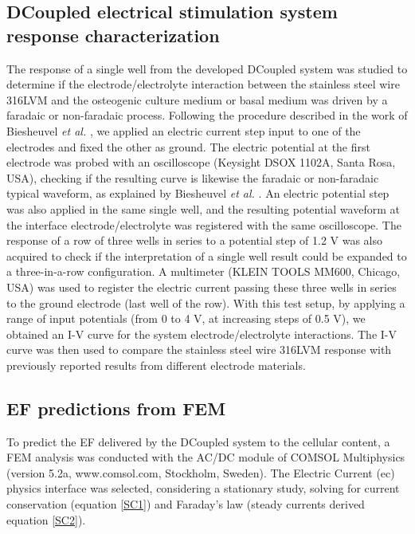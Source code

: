 \subsection{\acs{DCoupled} electrical stimulation system response characterization}
The response of a single well from the developed \acs{DCoupled} system was studied to determine if the electrode/electrolyte interaction between the stainless steel wire 316LVM and the osteogenic culture medium or basal medium was driven by a faradaic or non-faradaic process. Following the procedure described in the work of Biesheuvel \textit{et al.} \cite{Biesheuvel2018-wu}, we applied an electric current step input to one of the electrodes and fixed the other as ground. The electric potential at the first electrode was probed with an oscilloscope (Keysight DSOX 1102A, Santa Rosa, USA), checking if the resulting curve is likewise the faradaic or non-faradaic typical waveform, as explained by Biesheuvel \textit{et al.} \cite{Biesheuvel2018-wu}. An electric potential step was also applied in the same single well, and the resulting potential waveform at the interface electrode/electrolyte was registered with the same oscilloscope. The response of a row of three wells in series to a potential step of 1.2 \si{\volt} was also acquired to check if the interpretation of a single well result could be expanded to a three-in-a-row configuration. A multimeter (KLEIN TOOLS MM600, Chicago, USA) was used to register the electric current passing these three wells in series to the ground electrode (last well of the row). With this test setup, by applying a range of input potentials (from 0 to 4 \si{\volt}, at increasing steps of 0.5 \si{\volt}), we obtained an I-V curve for the system electrode/electrolyte interactions. The I-V curve was then used to compare the stainless steel wire 316LVM response with previously reported results from different electrode materials. 

\subsection{\acs{EF} predictions from \ac{FEM}}
To predict the \acs{EF} delivered by the \ac{DCoupled} system to the cellular content, a \acs{FEM} analysis was conducted with the AC/DC module of COMSOL Multiphysics (version 5.2a, www.comsol.com, Stockholm, Sweden). The Electric Current (ec) physics interface was selected, considering a stationary study, solving for current conservation (equation \ref{SC1}) and Faraday's law (steady currents derived equation \ref{SC2}).

